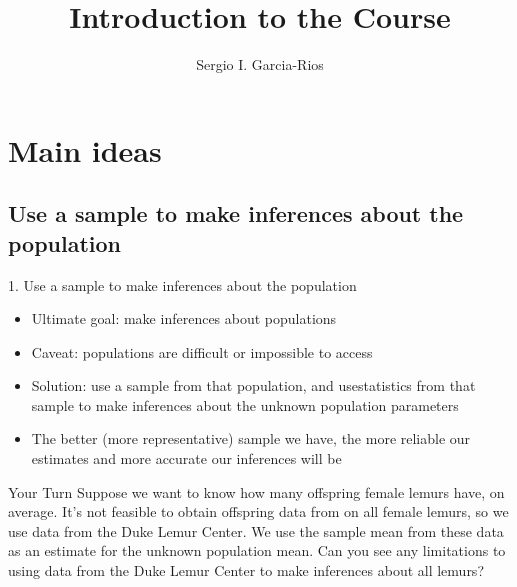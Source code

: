 \documentclass[11pt]{beamer}
\author{Sergio I. Garcia-Rios}
\title{Introduction to the Course}
\institute{Government 3990: Statistics in the Social Science}
\date{}
\begin{document}
\maketitle

\section{Main ideas}


\subsection{Use a sample to make inferences about the population}
\label{mi1}


\begin{frame}{1. Use a sample to make inferences about the population}
\small{
\begin{itemize}[<+->]
\item Ultimate goal: make inferences about populations
\item Caveat: populations are difficult or impossible to access
\item Solution: use a sample from that population, and use\alert{statistics} from that 
sample to make inferences about the unknown population \alert{parameters}
\item The better (more \alert{representative}) sample we have, the more reliable our 
estimates and more accurate our inferences will be
\end{itemize}

\pause


\begin{block}{Your Turn}
Suppose we want to know how many offspring female lemurs have, on average.
It's not feasible to obtain offspring data from on all female lemurs, so we use 
data from the Duke Lemur Center. We use the sample mean from these data as an 
estimate for the unknown population mean. Can you see any limitations to using data 
from the Duke Lemur Center to make inferences about all lemurs?
\end{block}
}
\end{frame}

\end{document}
